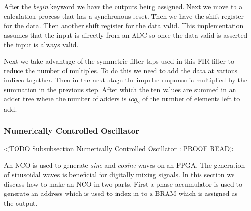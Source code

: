 After the \emph{begin} keyword we have the outputs being assigned. Next we move to a calculation process that has a synchronous reset. Then we have the shift register for the data. Then another shift register for the data valid. This implementation assumes that the input is directly from an \ac{ADC} so once the data valid is asserted the input is always valid. 

Next we take advantage of the symmetric filter taps used in this \ac{FIR} filter to reduce the number of multiples. To do this we need to add the data at various indices together. Then in the next stage the impulse response is multiplied by the summation in the previous step. After which the ten values are summed in an adder tree where the number of adders is $log_2$ of the number of elements left to add. 
	
\subsubsection{Numerically Controlled Oscillator}
	<TODO Subsubsection  Numerically Controlled Oscillator : PROOF READ>
	
An \ac{NCO} is used to generate \emph{sine} and \emph{cosine} waves on an \ac{FPGA}. The generation of sinusoidal waves is beneficial for digitally mixing signals. In this section we discuss how to make an \ac{NCO} in two parts. First a phase accumulator is used to generate an address which is used to index in to a \ac{BRAM} which is assigned as the output. 

